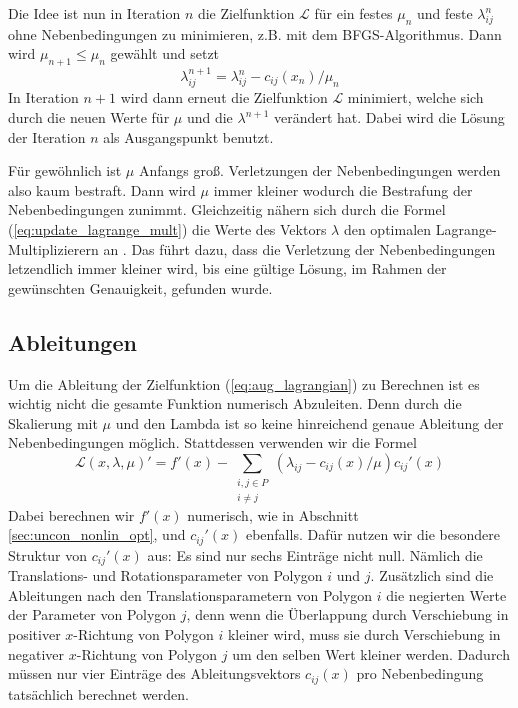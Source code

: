 \documentclass[runningheads,a4paper]{llncs}
\begin{document}
Die Idee ist nun in Iteration $n$ die Zielfunktion $\mathcal{L}$ für ein festes $\mu_n$ und feste $\lambda_{ij}^n$ ohne Nebenbedingungen zu minimieren, z.B. mit dem BFGS-Algorithmus. Dann wird ${\mu_{n+1} \le \mu_n}$ gewählt und setzt
\begin{equation}
\label{eq:update_lagrange_mult}
\lambda_{ij}^{n+1} = \lambda_{ij}^n - c_{ij}(x_n)/\mu_n 
\end{equation}
In Iteration $n+1$ wird dann erneut die Zielfunktion $\mathcal{L}$ minimiert, welche sich durch die neuen Werte für $\mu$ und die $\lambda^{n+1}$ verändert hat. Dabei wird die Lösung der Iteration $n$ als Ausgangspunkt benutzt.

Für gewöhnlich ist $\mu$ Anfangs groß. Verletzungen der Nebenbedingungen werden also kaum bestraft. Dann wird $\mu$ immer kleiner wodurch die Bestrafung der Nebenbedingungen zunimmt. Gleichzeitig nähern sich durch die Formel (\ref{eq:update_lagrange_mult}) die Werte des Vektors $\lambda$ den optimalen Lagrange-Multiplizierern an \cite{nocedal1999numerical}. Das führt dazu, dass die Verletzung der Nebenbedingungen letzendlich immer kleiner wird, bis eine gültige Lösung, im Rahmen der gewünschten Genauigkeit, gefunden wurde.

\subsection{Ableitungen}
Um die Ableitung der Zielfunktion (\ref{eq:aug_lagrangian}) zu Berechnen ist es wichtig nicht die gesamte Funktion numerisch Abzuleiten. Denn durch die Skalierung mit $\mu$ und den Lambda ist so keine hinreichend genaue Ableitung der Nebenbedingungen möglich. Stattdessen verwenden wir die Formel \cite{nocedal1999numerical}
\begin{equation*}
\mathcal{L}(x,\lambda,\mu)' = f'(x) - \sum_{\substack{i,j \in P \\ i\neq j}}(\lambda_{ij} - c_{ij}(x)/\mu) c_{ij}'(x)
\end{equation*}
Dabei berechnen wir $f'(x)$ numerisch, wie in Abschnitt \ref{sec:uncon_nonlin_opt}, und $c_{ij}'(x)$ ebenfalls. Dafür nutzen wir die besondere Struktur von $c_{ij}'(x)$ aus: Es sind nur sechs Einträge nicht null. Nämlich die Translations- und Rotationsparameter von Polygon $i$ und $j$. Zusätzlich sind die Ableitungen nach den Translationsparametern von Polygon $i$ die negierten Werte der Parameter von Polygon $j$, denn wenn die Überlappung durch Verschiebung in positiver $x$-Richtung von Polygon $i$ kleiner wird, muss sie durch Verschiebung in negativer $x$-Richtung von Polygon $j$ um den selben Wert kleiner werden. Dadurch müssen nur vier Einträge des Ableitungsvektors $c_{ij}(x)$ pro Nebenbedingung tatsächlich berechnet werden.


{}

\end{document}
